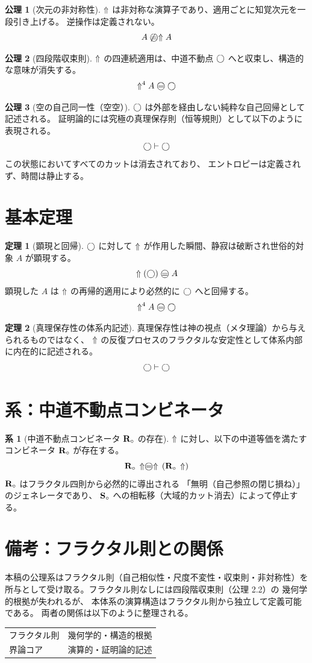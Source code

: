 \documentclass[11pt,a4paper]{article}
\theoremstyle{definition}
\newtheorem{axiom}{公理}[section]
\newtheorem{theorem}{定理}[section]
\newtheorem{corollary}{系}[section]
\begin{document}
\begin{axiom}[次元の非対称性]
$\Uparrow$ は非対称な演算子であり、適用ごとに知覚次元を一段引き上げる。
逆操作は定義されない。
$$A \not\mweq \metanegation A$$
\end{axiom}

\begin{axiom}[四段階収束則]
$\Uparrow$ の四連続適用は、中道不動点 $\bigcirc$ へと収束し、構造的な意味が消失する。
$$\metanegation^4 A \mweq \dfix$$
\end{axiom}

\begin{axiom}[空の自己同一性（空空）]
$\bigcirc$ は外部を経由しない純粋な自己回帰として記述される。
証明論的には究極の真理保存則（恒等規則）として以下のように表現される。
$$\bigcirc \vdash \bigcirc$$
この状態においてすべてのカットは消去されており、
エントロピーは定義されず、時間は静止する。
\end{axiom}

\section{基本定理}

\begin{theorem}[顕現と回帰]
$\bigcirc$ に対して $\Uparrow$ が作用した瞬間、静寂は破断され世俗的対象 $A$ が顕現する。
$$\metanegation(\dfix) \mweq A$$
顕現した $A$ は $\Uparrow$ の再帰的適用により必然的に $\bigcirc$ へと回帰する。
$$\metanegation^4 A \mweq \dfix$$
\end{theorem}

\begin{theorem}[真理保存性の体系内記述]
真理保存性は神の視点（メタ理論）から与えられるものではなく、
$\Uparrow$ の反復プロセスのフラクタルな安定性として体系内部に内在的に記述される。
$$\bigcirc \vdash \bigcirc$$
\end{theorem}

\section{系：中道不動点コンビネータ}

\begin{corollary}[中道不動点コンビネータ $\mathbf{R}_{\circ}$ の存在]
$\Uparrow$ に対し、以下の中道等価を満たすコンビネータ $\mathbf{R}_{\circ}$ が存在する。
$$\Rmw\, \metanegation \mweq \metanegation\,(\Rmw\, \metanegation)$$
$\mathbf{R}_{\circ}$ はフラクタル四則から必然的に導出される
「無明（自己参照の閉じ損ね）」のジェネレータであり、
$\mathbf{S}_{\circ}$ への相転移（大域的カット消去）によって停止する。
\end{corollary}

\section*{備考：フラクタル則との関係}

本稿の公理系はフラクタル則（自己相似性・尺度不変性・収束則・非対称性）を
所与として受け取る。フラクタル則なしには四段階収束則（公理 2.2）の
幾何学的根拠が失われるが、
本体系の演算構造はフラクタル則から独立して定義可能である。
両者の関係は以下のように整理される。

\begin{center}
\begin{tabular}{ll}
\hline
フラクタル則 & 幾何学的・構造的根拠 \\
界論コア    & 演算的・証明論的記述 \\
\hline
\end{tabular}
\end{center}
\end{document}
